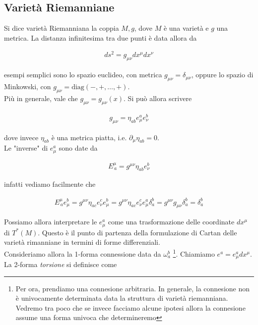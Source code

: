 \documentclass{report}
\begin{document}
\subsection{Varietà Riemanniane}

Si dice varietà Riemanniana la coppia  \(M, g\), dove \(M\) è una varietà e \(g\) una metrica. La distanza infinitesima tra due punti è data allora da 

\begin{align}
    ds^2 = g_{\mu\nu}dx^{\mu}dx^{\nu}
\end{align}

esempi semplici sono lo spazio euclideo, con metrica \(g_{\mu\nu} = \delta_{\mu\nu}\), oppure lo spazio di Minkowski, con \(g_{\mu\nu} = \text{diag}(-, +, \ldots, +)\).  \\

Più in generale, vale che \(g_{\mu\nu} = g_{\mu\nu}(x)\). Si può allora scrivere 

\begin{align}
    g_{\mu\nu} = \eta_{ab}e^a_\mu e^b_\nu
\end{align}

dove invece \(\eta_{ab}\) è una metrica piatta, i.e. \(\partial_\mu \eta_{ab} =0\). \\

Le "inverse" di \(e^a_\mu\) sono date da 

\begin{align}
    E^{\mu}_{\, a} = g^{\mu\nu}\eta_{ab}e^b_\nu
\end{align}

infatti vediamo facilmente che 

\begin{align}
    E^{\mu}_{\, a}e^b_\mu = g^{\mu\nu}\eta_{ac}e^c_\nu e^b_\mu = g^{\mu\nu}\eta_{ac}e^c_\nu e^a_\mu \delta^b_a = g^{\mu\nu}g_{\mu\nu}\delta^b_a = \delta^b_a
\end{align}

Possiamo allora interpretare le \(e^a_\mu\) come una trasformazione delle coordinate \(dx^\mu\) di \(T^*(M)\). Questo è il punto di partenza della formulazione di Cartan delle varietà rimanniane in termini di forme differenziali. \\

Consideriamo allora la 1-forma connessione data da \(\omega^b_a\) \footnote{Per ora, prendiamo una connesione arbitraria. In generale, la connesione non è univocamente determinata data la struttura di varietà riemanniana. Vedremo tra poco che se invece facciamo alcune ipotesi allora la connesione assume una forma univoca che determineremo}. Chiamiamo \(e^a = e^a_\mu dx^\mu\). La 2-forma \emph{torsione} si definisce come 
\end{document}
